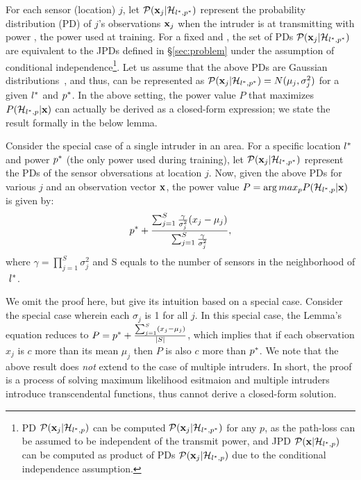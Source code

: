 For each sensor (location) $j$, let $\mathcal{P}(\mathbf{x}_j | \mathcal{H}_{l^*,p^*})$ represent the
probability distribution (PD) of $j$'s observations $\mathbf{x}_j$ when the
intruder is at \lstar transmitting with power \pstar, the power used
at training.
For a fixed \lstar and \pstar, the set of PDs $\mathcal{P}(\mathbf{x}_j | \mathcal{H}_{l^*,p^*})$ are
equivalent to the JPDs defined in \S\ref{sec:problem} under the
assumption of conditional independence\footnote{PD $\mathcal{P}(\mathbf{x}_j |
  \mathcal{H}_{l^*,p})$ can be computed $\mathcal{P}(\mathbf{x}_j | \mathcal{H}_{l^*,p^*})$ for any $p$, as the
  path-loss can be assumed to be independent of the transmit power,
  and JPD $\mathcal{P}(\mathbf{x} | \mathcal{H}_{l^*,p})$ can be computed as product of PDs
  $\mathcal{P}(\mathbf{x}_j | \mathcal{H}_{l^*,p})$ due to the conditional independence assumption.}.
Let us assume that the above PDs are Gaussian
distributions~\cite{gauss}, and thus, can be represented as $\mathcal{P}(\mathbf{x}_j
| \mathcal{H}_{l^*,p^*}) = N(\mu_j, \sigma_j^2)$ for a given $l^*$ and $p^*$.
In the above setting, the power value $P$ that maximizes $P(\mathcal{H}_{l^*,p} | \mathbf{x})$
can actually be derived as a closed-form expression; we state the result
formally in the below lemma. 
\begin{lemma-wo-prf}
  Consider the special case of a single intruder in an area.  For a
  specific location $l^*$ and power $p^*$ (the only power used
  during training), let $\mathcal{P}(\mathbf{x}_j | \mathcal{H}_{l^*,p^*})$ represent the PDs of the
  sensor obversations at location $j$. Now, given the above PDs for
  various $j$ and an observation vector $\mathbf{x}$, the power value
  $P = \arg max_p P(\mathcal{H}_{l^*,p} | \mathbf{x})$ is   given by: 
  $$p^* + \frac{\sum_{j=1}^{S} \frac{\gamma}{\sigma_j^2}(x_j - \mu_j)}{\sum_{j=1}^{S} \frac{\gamma}{\sigma_j^2}},$$
  where $\gamma = \prod_{j=1}^{S} \sigma_j^2$ and S equals to the number of sensors in the neighborhood of  $\ l^*$.
  \label{lem:p}
\end{lemma-wo-prf}
We omit the proof here, but give its intuition based on a special
case. Consider the special case wherein each $\sigma_j$ is 1 for all
$j$. In this special case, the Lemma's equation reduces to $P = p^*
+ \frac{\sum_{j=1}^{S}(x_j - \mu_j)}{|S|}$, which implies that if each
observation $x_j$ is $c$ more than its mean $\mu_j$ then $P$ is also
$c$ more than $p^*$. We note that the above result does {\em not}
extend to the case of multiple intruders. In short, the proof is a process of solving maximum likelihood esitmaion and multiple intruders introduce transcendental functions, thus cannot derive a closed-form solution.

